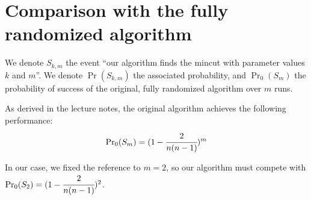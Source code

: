 \section{Comparison with the fully randomized algorithm}
  We denote $S_{k, m}$ the event ``our algorithm finds the mincut with parameter values $k$ and $m$''. We denote $\Pr(S_{k, m})$ the associated probability, and $\Pr_0(S_m)$ the probability of success of the original, fully randomized algorithm over $m$ runs.

  \noindent
  As derived in the lecture notes, the original algorithm achieves the following performance:
  \[
    {\Pr}_0(S_m) = (1 - \cfrac{2}{n(n-1)})^m
  \]

  \noindent
  In our case, we fixed the reference to $m = 2$, so our algorithm must compete with $\Pr_0(S_2) = (1 - \cfrac{2}{n(n-1)})^2$.

